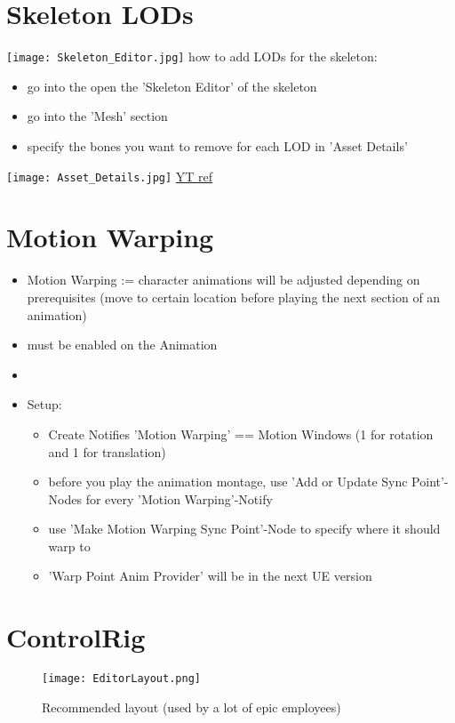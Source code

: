     \section{Skeleton LODs}
         \texttt{[image: Skeleton\_Editor.jpg]}
        how to add LODs for the skeleton:
        \begin{itemize}
            \item go into the open the 'Skeleton Editor' of the skeleton
            \item go into the 'Mesh' section
            \item specify the bones you want to remove for each LOD in 'Asset Details'
        \end{itemize}
        \texttt{[image: Asset\_Details.jpg]}
        \href{https://www.youtube.com/watch?v=ti8NopRIgFs}{YT ref}



    \section{Motion Warping}
            \begin{itemize}
            \item Motion Warping := character animations will be adjusted depending on prerequisites (move to certain location before playing the next section of an animation)
            \item {} must be enabled on the Animation
            \item 
            \item Setup:
            \begin{itemize}
                \item Create Notifies 'Motion Warping' == Motion Windows (1 for rotation and 1 for translation)
                \item before you play the animation montage, use 'Add or Update Sync Point'-Nodes for every 'Motion Warping'-Notify
                \item use 'Make Motion Warping Sync Point'-Node to specify where it should warp to
                \item 'Warp Point Anim Provider' will be in the next UE version
            \end{itemize}
        \end{itemize}

    \section{ControlRig}
        \begin{figure}
            \texttt{[image: EditorLayout.png]}
            \caption{Recommended layout (used by a lot of epic employees)}
            \label{}
        \end{figure}

